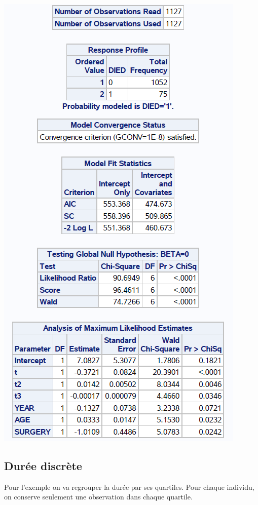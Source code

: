 \documentclass[
  12pt,
  letterpaper,
  DIV=11,
  numbers=noendperiod,
  onepage,
  openany]{scrreprt}
\begin{document}
\includegraphics{sas/7a.PNG}

\hypertarget{duruxe9e-discruxe8te}{%
\subsection{Durée discrète}\label{duruxe9e-discruxe8te}}

Pour l'exemple on va regrouper la durée par ses quartiles. Pour chaque
individu, on conserve seulement une observation dans chaque quartile.
\end{document}
